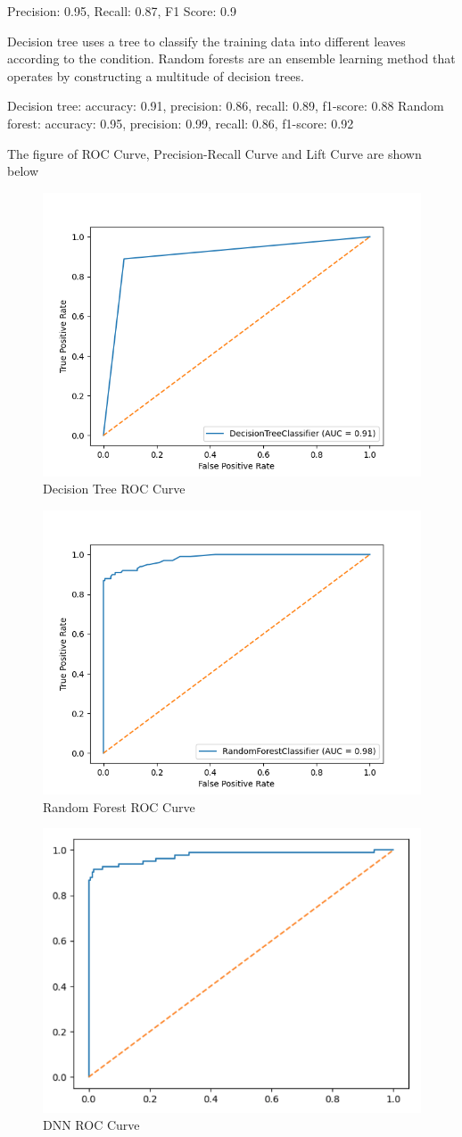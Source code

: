 \documentclass{../../Latex_Template/Homework/homework}
\begin{document}
\begin{alphaparts}
    \questionpart
    Precision: 0.95, Recall: 0.87, F1 Score: 0.9
        
    \questionpart
    Decision tree uses a tree to classify the training data into different
    leaves according to the condition. Random forests are an ensemble learning
    method that operates by constructing a multitude of decision trees.
        
    \questionpart
    Decision tree: accuracy: 0.91, precision: 0.86, recall: 0.89, f1-score: 0.88
    Random forest: accuracy: 0.95, precision: 0.99, recall: 0.86, f1-score: 0.92
         
    \questionpart
    The figure of ROC Curve, Precision-Recall Curve and Lift Curve are shown
    below
    \begin{figure}[h]
      \centering
      \includegraphics[width=0.5\linewidth]{DST_ROC.png}
      \caption{Decision Tree ROC Curve}
      \label{fig:DST_ROC.png}
    \end{figure}
          
    \begin{figure}[h]
      \centering
      \includegraphics[width=0.5\linewidth]{RF_ROC.png}
      \caption{Random Forest ROC Curve}
      \label{fig:RF_ROC}
    \end{figure}
    
    \pagebreak
    
    \begin{figure}[h]
      \centering
      \includegraphics[width=0.5\linewidth]{DNN_ROC.png}
      \caption{DNN ROC Curve}
      \label{fig:DNN_ROC}
    \end{figure}


\end{alphaparts}
\end{document}
